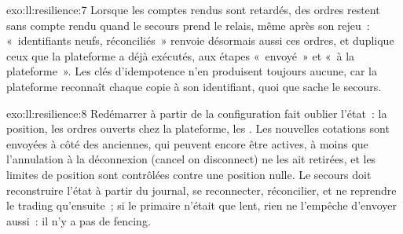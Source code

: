 \begin{solution}{exo:ll:resilience:7}
Lorsque les comptes rendus sont retardés, des ordres restent sans compte rendu quand le secours prend le relais, même après son rejeu~: «~identifiants neufs,
réconciliés~» renvoie désormais aussi ces ordres, et duplique ceux que la plateforme a déjà exécutés, aux étapes «~envoyé~» et «~à
la plateforme~». Les clés d'idempotence n'en produisent toujours aucune, car la plateforme reconnaît chaque copie à son identifiant, quoi que
sache le secours.
\end{solution}

\begin{solution}{exo:ll:resilience:8}
Redémarrer à partir de la configuration fait oublier l'état~: la position, les ordres ouverts chez la plateforme, les . Les nouvelles
cotations sont envoyées à côté des anciennes, qui peuvent encore être actives, à moins que l'annulation à la déconnexion (cancel on disconnect) ne les ait retirées, et les
limites de position sont contrôlées contre une position nulle. Le secours doit reconstruire l'état à partir du journal, se reconnecter, réconcilier, et
ne reprendre le trading qu'ensuite~; si le primaire n'était que lent, rien ne l'empêche d'envoyer aussi~: il n'y a pas de fencing.
\end{solution}

